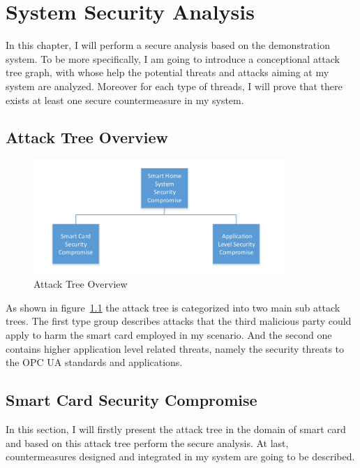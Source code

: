 \chapter{System Security Analysis}
In this chapter, I will perform a secure analysis based on the demonstration system. To be more specifically, I am going to introduce a conceptional attack tree graph, with whose help the potential threats and attacks aiming at my system are analyzed. Moreover for each type of threads, I will prove that there exists at least one secure countermeasure in my system.

\section{Attack Tree Overview}

 \begin{figure}[!htb]
	\centering
	\includegraphics[width=0.85\textwidth]{attack-tree-overview}
		\caption{Attack Tree Overview}
	\label{fig:attack-tree-overview}
\end{figure}
As shown in figure~\ref{fig:attack-tree-overview} the attack tree is categorized into two main sub attack  trees. The first type group describes attacks that the third malicious party could apply to harm the smart card employed in my scenario. And the second one contains higher application level related threats, namely the security threats to the OPC UA standards and applications. 

\section{Smart Card Security Compromise}
In this section, I will firstly present the attack tree in the domain of smart card and based on this attack tree  perform the secure analysis. At last, countermeasures designed and integrated in my system are going to be described.

